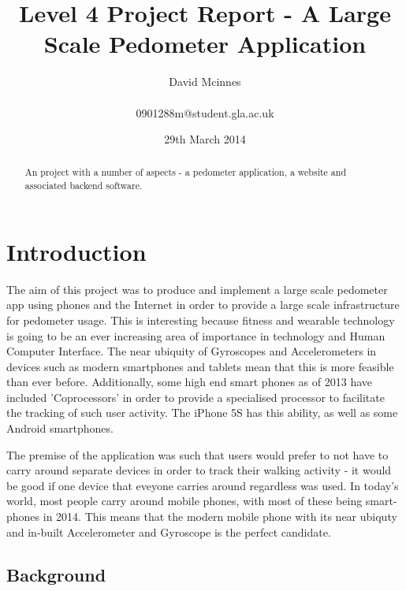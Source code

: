 \documentclass{l4proj}
\begin{document}
\title{Level 4 Project Report - A Large Scale Pedometer Application}
\author{David Mcinnes\\ \\0901288m@student.gla.ac.uk}
\date{29th March 2014}
\maketitle

\begin{abstract}
An project with a number of aspects - a pedometer application, a website and associated backend software.
\end{abstract}

\educationalconsent
\tableofcontents

\chapter{Introduction}

The aim of this project was to produce and implement a large scale pedometer app using phones and the Internet in order to provide a large scale infrastructure for pedometer usage. This is interesting because fitness and wearable technology is going to be an ever increasing area of importance in technology and Human Computer Interface. The near ubiquity of Gyroscopes and Accelerometers in devices such as modern smartphones and tablets mean that this is more feasible than ever before. Additionally, some high end smart phones as of 2013 have included 'Coprocessors' in order to provide a specialised processor to facilitate the tracking of such user activity. The iPhone 5S has this ability, as well as some Android smartphones. 

The premise of the application was such that users would prefer to not have to carry around separate devices in order to track their walking activity - it would be good if one device that eveyone carries around regardless was used. In today's world, most people carry around mobile phones, with most of these being smart-phones in 2014. This means that the modern mobile phone with its near ubiquty and in-built Accelerometer and Gyroscope is the perfect candidate.


\section{Background}
\end{document}
